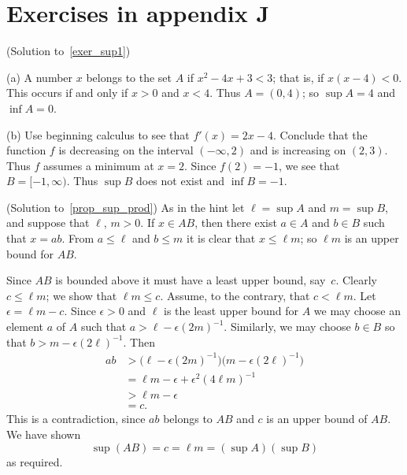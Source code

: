 \section{Exercises in appendix J}

\begin{prf}\label{sol_exer_sup1}(Solution to~\ref{exer_sup1})

(a) A number $x$ belongs to the set $A$ if $x^2 - 4x + 3 < 3$; that is, if $x(x - 4) < 0$.
This occurs if and only if  $x > 0$ and $x < 4$.  Thus $A = (0,4)$; so $\sup A = 4$ and $\inf
A = 0$.

(b) Use beginning calculus to see that $f'(x) = 2x - 4$. Conclude that the function $f$ is
decreasing on the interval $(-\infty,2)$ and is increasing on $(2, 3)$. Thus $f$ assumes a
minimum at $x = 2$. Since $f(2) = -1$, we see that $B = [-1,\infty)$.  Thus $\sup B$ does not
exist and $\inf B = -1$.
\end{prf}

\begin{prf}\label{sol_prop_sup_prod}(Solution to~\ref{prop_sup_prod})
As in the hint let $\ell = \sup A$ and  $m = \sup B$, and suppose that $\ell$, $m > 0$. If $x
\in AB$, then there exist $a \in A$ and $b \in B$ such that $x = ab$.  From $a \le \ell$ and
$b \le m$ it is clear that $x \le \ell m$; so $\ell m$ is an upper bound for $AB$.

Since $AB$ is bounded above it must have a least upper bound, say~$c$.  Clearly $c \le \ell
m$; we show that $\ell m \le c$. Assume, to the contrary, that $c < \ell m$. Let $\epsilon =
\ell m - c$.  Since $\epsilon > 0$ and $\ell$ is the least upper bound for $A$ we may choose
an element $a$ of $A$ such that $a > \ell - \epsilon(2m)^{-1}$.  Similarly, we may choose $b
\in B$ so that $b > m - \epsilon(2\ell)^{-1}$. Then
  \begin{align*}
     ab &> \bigl(\ell - \epsilon(2m)^{-1}\bigr)\bigl(m - \epsilon(2\ell)^{-1}\bigr) \\
        &= \ell m - \epsilon + \epsilon^2(4\ell m)^{-1} \\
        &> \ell m - \epsilon \\
        &= c.
  \end{align*}
This is a contradiction, since $ab$ belongs to $AB$ and $c$ is an upper bound of $AB$.  We
have shown
  \[ \sup(AB) = c = \ell m = (\sup A)(\sup B) \]
as required.
\end{prf}

